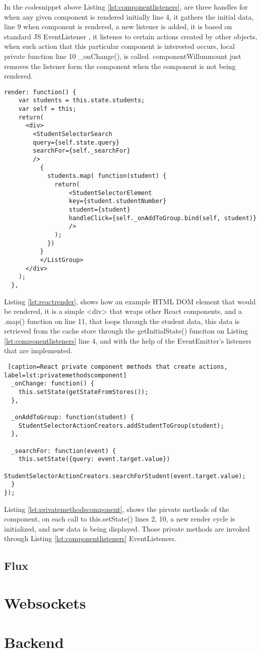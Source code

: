 In the codesnippet above Listing \ref{lst:componentlisteners}, are three handles for when any given component  is rendered initially line 4, it gathers the initial data, line 9 when component is rendered, a new listener is added, it is based on standard JS EventListener \cite{eventlistener}, it listenes to certain actions created by other objects, when such action that this particular component is interested occurs, local private function line 10 \_onChange(), is called. componentWillunmount just removes the listener form the component when the component is not being rendered.
\newpage
\begin{lstlisting}[caption=React render method rendering when the state is updated, label=lst:reactrender]
  render: function() {
    var students = this.state.students;
    var self = this;
    return(
      <div>
        <StudentSelectorSearch
        query={self.state.query}
        searchFor={self._searchFor}
        />
          {
            students.map( function(student) {
              return(
                  <StudentSelectorElement
                  key={student.studentNumber}
                  student={student}
                  handleClick={self._onAddToGroup.bind(self, student)}
                  />
              );
            })
          }
          </ListGroup>
      </div>
    );
  },
\end{lstlisting}

Listing \ref{lst:reactrender}, shows how an example HTML DOM element that would be rendered, it is a simple <div> that wraps other React components, and a .map() function on line 11, that loops through the student data, this data is retrieved from the cache store through the getInitialState() funciton on Listing \ref{lst:componentlisteners} line 4, and with the help of the EventEmitter's listeners that are implemented.
\newpage
\begin{lstlisting} [caption=React private component methods that create actions, label=lst:privatemethodscomponent]
  _onChange: function() {
    this.setState(getStateFromStores());
  },

  _onAddToGroup: function(student) {
    StudentSelectorActionCreators.addStudentToGroup(student);
  },

  _searchFor: function(event) {
    this.setState({query: event.target.value})
    StudentSelectorActionCreators.searchForStudent(event.target.value);
  }
});
\end{lstlisting}


Listing \ref{lst:privatemethodscomponent}, shows the pirvate methods of the component, on each call to this.setState() lines 2, 10, a new render cycle is initialized, and new data is being displayed. Those private methods are invoked through Listing \ref{lst:componentlisteners} EventListeners.




\subsection{Flux}

\section{Websockets}

\section{Backend}

